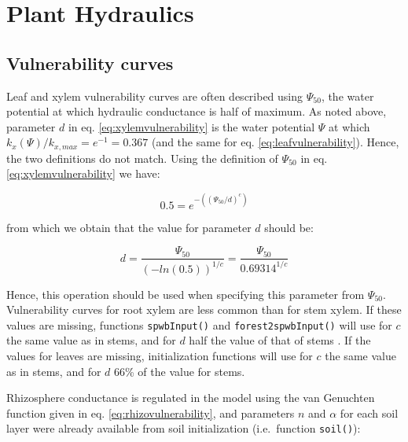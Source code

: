 \documentclass[]{book}
\newenvironment{Shaded}{\begin{snugshade}}{\end{snugshade}}
\newcommand{\KeywordTok}[1]{\textcolor[rgb]{0.13,0.29,0.53}{\textbf{#1}}}
\newcommand{\DecValTok}[1]{\textcolor[rgb]{0.00,0.00,0.81}{#1}}
\newcommand{\StringTok}[1]{\textcolor[rgb]{0.31,0.60,0.02}{#1}}
\newcommand{\OperatorTok}[1]{\textcolor[rgb]{0.81,0.36,0.00}{\textbf{#1}}}
\newcommand{\NormalTok}[1]{#1}
\begin{document}
\section{Plant Hydraulics}\label{plant-hydraulics-1}

\subsection{Vulnerability curves}\label{vulnerability-curves-1}

Leaf and xylem vulnerability curves are often described using
\(\Psi_{50}\), the water potential at which hydraulic conductance is
half of maximum. As noted above, parameter \(d\) in eq.
\eqref{eq:xylemvulnerability} is the water potential \(\Psi\) at which
\(k_{x}(\Psi)/k_{x,max} = e^{-1} = 0.367\) (and the same for eq.
\eqref{eq:leafvulnerability}). Hence, the two definitions do not match.
Using the definition of \(\Psi_{50}\) in eq. \eqref{eq:xylemvulnerability}
we have:

\begin{equation}
0.5 = e^{-((\Psi_{50}/d)^c)}
\end{equation}

from which we obtain that the value for parameter \(d\) should be:

\begin{equation}
d = \frac{\Psi_{50}}{(-ln(0.5))^{1/c}}= \frac{\Psi_{50}}{0.69314^{1/c}}
\end{equation}

Hence, this operation should be used when specifying this parameter from
\(\Psi_{50}\). Vulnerability curves for root xylem are less common than
for stem xylem. If these values are missing, functions
\texttt{spwbInput()} and \texttt{forest2spwbInput()} will use for \(c\)
the same value as in stems, and for \(d\) half the value of that of
stems \citep{Sperry2016}. If the values for leaves are missing,
initialization functions will use for \(c\) the same value as in stems,
and for \(d\) 66\% of the value for stems.

Rhizosphere conductance is regulated in the model using the van
Genuchten function given in eq. \eqref{eq:rhizovulnerability}, and
parameters \(n\) and \(\alpha\) for each soil layer were already
available from soil initialization (i.e.~function \texttt{soil()}):

\begin{Shaded}
\end{Shaded}
\end{document}
